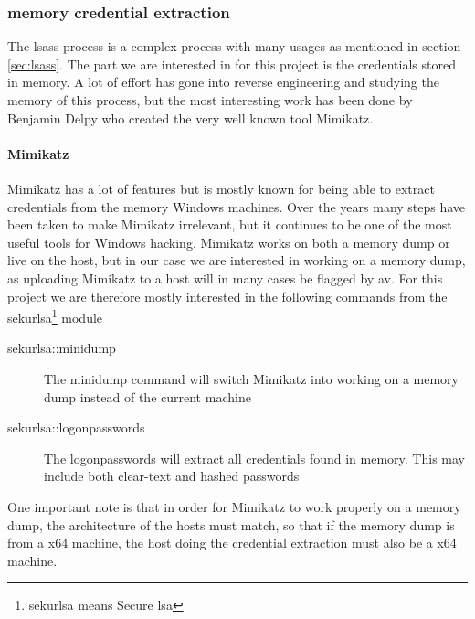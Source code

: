 \documentclass{article}
\begin{document}
\subsubsection{ memory credential extraction}
The \gls{lsass} process is a complex process with many usages as mentioned in section \ref{sec:lsass}. The part we are interested in for this project is the credentials stored in memory. A lot of effort has gone into reverse engineering and studying the memory of this process, but the most interesting work has been done by Benjamin Delpy who created the very well known tool Mimikatz\cite{url:lsass:mimikatz}.
\label{sec:mimikatz}
\paragraph{Mimikatz} Mimikatz has a lot of features but is mostly known for being able to extract credentials from the memory Windows machines. Over the years many steps have been taken to make Mimikatz irrelevant, but it continues to be one of the most useful tools for Windows hacking. Mimikatz works on both a memory dump or live on the host, but in our case we are interested in working on a memory dump, as uploading Mimikatz to a host will in many cases be flagged by \gls{av}. For this project we are therefore mostly interested in the following commands from the sekurlsa\footnote{sekurlsa means Secure \gls{lsa}} module\cite{url:lsass:mimikatz:sekurlsa}

\begin{description}
    \item[sekurlsa::minidump] The minidump command will switch Mimikatz into working on a memory dump instead of the current machine
    \item[sekurlsa::logonpasswords] The logonpasswords will extract all credentials found in memory. This may include both clear-text and hashed passwords
\end{description}

One important note is that in order for Mimikatz to work properly on a memory dump, the architecture of the hosts must match, so that if the memory dump is from a x64 machine, the host doing the credential extraction must also be a x64 machine.
\end{document}

